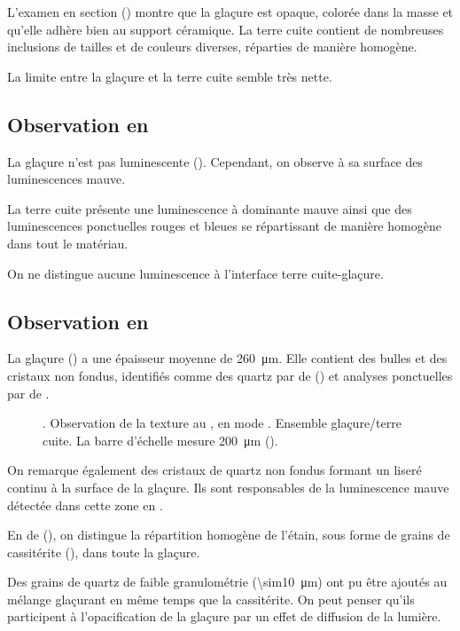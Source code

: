 L'examen en section () montre que la 
glaçure est opaque, colorée dans la masse et qu'elle adhère bien au 
support céramique. La terre cuite contient de nombreuses inclusions 
de tailles et de couleurs diverses, réparties de manière homogène.

La limite entre la glaçure et la terre cuite semble très nette.

\subsection{Observation en \CL}

La glaçure n'est pas luminescente (). 
Cependant, on observe à sa surface des luminescences mauve.

La terre cuite présente une luminescence à dominante mauve ainsi que 
des luminescences ponctuelles rouges et bleues se répartissant de 
manière homogène dans tout le matériau.

On ne distingue aucune luminescence à l'interface terre cuite-glaçure.

\subsection{Observation en \MEB[ie]}
La glaçure () a une épaisseur moyenne de 
\SI{260}{\um}. Elle contient des bulles et des cristaux non fondus, 
identifiés comme des quartz par \carto de \RX 
() et analyses ponctuelles par \spectro 
de \RX.

\begin{figure}[htb]
  \caption{\legendeE.
           Observation de la texture au \MEB, en mode \ERD. 
           Ensemble glaçure/terre cuite. La barre d'échelle mesure 
           \SI{200}{\um} ().}
  \label{MEB:6532_img}
\end{figure}

On remarque également des cristaux de quartz non fondus formant un 
liseré continu à la surface de la glaçure. Ils sont responsables de 
la luminescence mauve détectée dans cette zone en \CL.

En \carto de \RX (), on distingue la 
répartition homogène de l'étain, sous forme de grains de cassitérite 
(\cassiterite), dans toute la glaçure.

Des grains de quartz de faible granulométrie (\SI{\sim10}{\um}) ont pu 
être ajoutés au mélange glaçurant en même temps que la cassitérite. On 
peut penser qu'ils participent à l'opacification de la glaçure par un 
effet de diffusion de la lumière.

